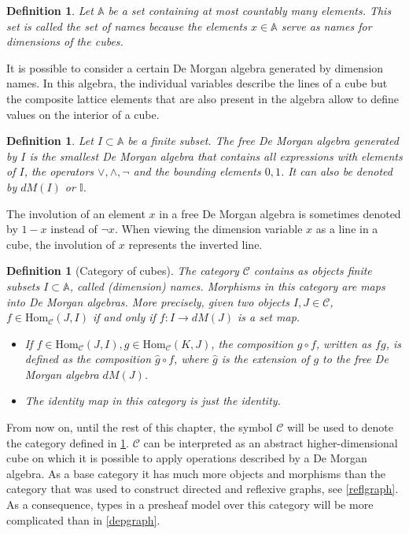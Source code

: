 \documentclass[12pt,a4paper,twoside,xetex]{book}
\newcommand{\keyword}[1]{\emph{#1}\index{#1}}
\newtheorem{definition}[theorem]{Definition}
\newcommand{\homo}[3]{\text{Hom}_{#1}\left(#2,#3\right)}
\begin{document}
\begin{definition}
Let $\mathbb{A}$ be a set containing at most countably many elements. This set 
is called the \keyword{set of names} because the elements $x \in \mathbb{A}$ 
serve as names for dimensions of the cubes. 
\end{definition}

It is possible to consider a certain De Morgan algebra generated by dimension 
names. In this algebra, the individual variables describe the lines of a cube 
but the composite lattice elements that are also present in the algebra allow 
to define values on the interior of a cube.


\begin{definition}\label{freedm}
Let $I \subset \mathbb{A}$ be a finite subset. The \keyword{free De Morgan 
algebra} generated by $I$ is the smallest De Morgan algebra that contains all 
expressions with elements of $I$, the operators $\vee, \wedge, \neg$ and  the 
bounding elements $0, 1$. It can also be denoted by $dM(I)$ or $\mathbb{I}$.
\end{definition}

The involution of an element $x$ in a free De Morgan algebra is sometimes 
denoted by $1- x$ instead  of $\neg x$. When viewing the dimension variable $x$ 
as a line in a cube, the involution of $x$ represents the inverted line. 




\begin{definition}[Category of cubes]\label{cubcat}
  The category $\mathcal{C}$ contains as objects finite subsets $I \subset 
\mathbb{A}$, called (dimension) names. Morphisms in this category are maps into 
De Morgan algebras. More precisely, given two objects $I,J \in \mathcal{C}$, $f 
\in \text{Hom}_{\mathcal{C}}(J,I)$ if and only if $f: I \rightarrow dM(J)$ is a 
set map.
  \begin{itemize}
  \item  If $f \in \homo{\mathcal{C}}{J}{I}, g \in \homo{\mathcal{C}}{K}{J}$, 
the composition $g \circ f$, written as $fg$, is defined as the composition  
$\hat{g} \circ f$, where $\hat{g}$ is the extension of $g$ to the free De 
Morgan algebra $dM(J)$.
    \item The identity map in this category is just the identity.
\end{itemize}
    \end{definition}

From now on, until the rest of this chapter, the symbol $\mathcal{C}$ will be 
used to denote the category defined in \cref{cubcat}. $\mathcal{C}$ can be 
interpreted as an abstract higher-dimensional cube on which it is possible to 
apply operations described by a De Morgan algebra. As a base category it has 
much more objects and morphisms than the category that was used to construct 
directed and reflexive graphs, see \cref{reflgraph}. As a consequence, types in 
a presheaf model over this category will be more complicated than in 
\cref{depgraph}.
\end{document}
